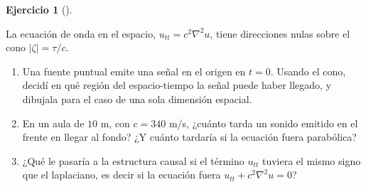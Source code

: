 \documentclass[
  spanish,
  a4paper,
]{scrbook}
\providecommand{\tightlist}{%
  \setlength{\itemsep}{0pt}\setlength{\parskip}{0pt}}
\theoremstyle{definition}
\theoremstyle{plain}
\theoremstyle{definition}
\theoremstyle{plain}
\theoremstyle{definition}
\newtheorem{exercise}{Ejercicio}[chapter]
\theoremstyle{remark}
\begin{document}
\begin{exercise}[]\protect\hypertarget{exr-cono-luz}{}\label{exr-cono-luz}

La ecuación de onda en el espacio, \(u_{tt} = c^2\nabla^2u\), tiene
direcciones nulas sobre el cono \(|\zeta| = \tau/c\).

\begin{enumerate}
\def\labelenumi{\alph{enumi}.}
\tightlist
\item
  Una fuente puntual emite una señal en el origen en \(t=0\). Usando el
  cono, decidí en qué región del espacio-tiempo la señal puede haber
  llegado, y dibujala para el caso de una sola dimensión espacial.
\item
  En un aula de \(10\) m, con \(c = 340\) m/s, ¿cuánto tarda un sonido
  emitido en el frente en llegar al fondo? ¿Y cuánto tardaría si la
  ecuación fuera parabólica?
\item
  ¿Qué le pasaría a la estructura causal si el término \(u_{tt}\)
  tuviera el mismo signo que el laplaciano, es decir si la ecuación
  fuera \(u_{tt} + c^2\nabla^2u = 0\)?
\end{enumerate}

\end{exercise}
\end{document}
